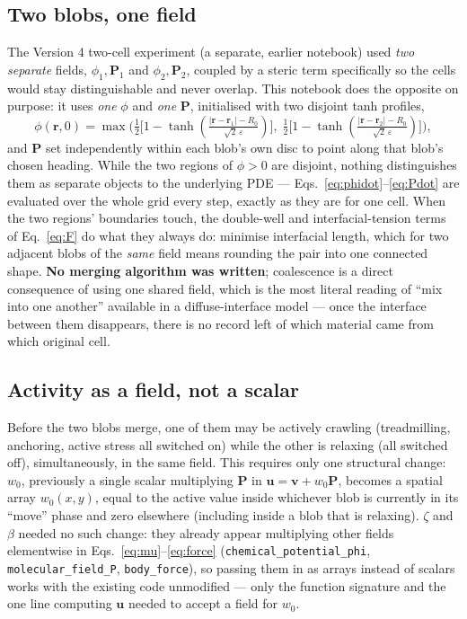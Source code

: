 \documentclass[11pt]{article}
\newcommand{\bP}{\mathbf{P}}
\newcommand{\bv}{\mathbf{v}}
\newcommand{\bu}{\mathbf{u}}
\newcommand{\br}{\mathbf{r}}
\begin{document}
\subsection{Two blobs, one field}
\label{sec:oneField}
The Version 4 two-cell experiment (a separate, earlier notebook) used
\emph{two separate} fields, $\phi_1,\bP_1$ and $\phi_2,\bP_2$, coupled
by a steric term specifically so the cells would stay distinguishable
and never overlap. This notebook does the opposite on purpose: it
uses \emph{one} $\phi$ and \emph{one} $\bP$, initialised with two
disjoint tanh profiles,
\begin{equation}
\phi(\br,0) = \max\Big(\tfrac12\big[1-\tanh(\tfrac{|\br-\br_1|-R_0}{\sqrt2\,\varepsilon})\big],\;
\tfrac12\big[1-\tanh(\tfrac{|\br-\br_2|-R_0}{\sqrt2\,\varepsilon})\big]\Big),
\end{equation}
and $\bP$ set independently within each blob's own disc to point
along that blob's chosen heading. While the two regions of $\phi>0$
are disjoint, nothing distinguishes them as separate objects to the
underlying PDE — Eqs.~\eqref{eq:phidot}--\eqref{eq:Pdot} are evaluated
over the whole grid every step, exactly as they are for one cell.
When the two regions' boundaries touch, the double-well and
interfacial-tension terms of Eq.~\eqref{eq:F} do what they always do:
minimise interfacial length, which for two adjacent blobs of the
\emph{same} field means rounding the pair into one connected shape.
\textbf{No merging algorithm was written}; coalescence is a direct
consequence of using one shared field, which is the most literal
reading of ``mix into one another'' available in a diffuse-interface
model — once the interface between them disappears, there is no
record left of which material came from which original cell.

\subsection{Activity as a field, not a scalar}
Before the two blobs merge, one of them may be actively crawling
(treadmilling, anchoring, active stress all switched on) while the
other is relaxing (all switched off), simultaneously, in the same
field. This requires only one structural change: $w_0$, previously a
single scalar multiplying $\bP$ in $\bu=\bv+w_0\bP$, becomes a
spatial array $w_0(x,y)$, equal to the active value inside whichever
blob is currently in its ``move'' phase and zero elsewhere (including
inside a blob that is relaxing). $\zeta$ and $\beta$ needed no such
change: they already appear multiplying other fields elementwise in
Eqs.~\eqref{eq:mu}--\eqref{eq:force}
(\texttt{chemical\_potential\_phi}, \texttt{molecular\_field\_P},
\texttt{body\_force}), so passing them in as arrays instead of scalars
works with the existing code unmodified — only the
function signature and the one line computing $\bu$ needed to accept
a field for $w_0$.
\end{document}
